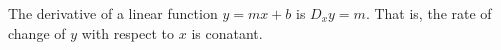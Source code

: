 \documentclass{book}
\begin{document}
The derivative of a linear function
$y=mx+b$ is $D_{x}y=m$. That is, the rate
of change of $y$ with respect to $x$ is
conatant.
\end{document}
